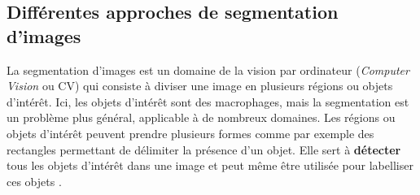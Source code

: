 \documentclass[a4paper,12pt]{report}
\renewcommand{\nameref}[1]{\textbf{\oldnameref{#1}}}
\newcommand{\figref}[1]{Figure~\ref{#1}}
\begin{document}




\subsection{Différentes approches de segmentation d'images}
La segmentation d'images est un domaine de la vision par ordinateur (\textit{Computer Vision} ou CV) qui consiste à diviser une image en plusieurs régions ou objets d'intérêt. Ici, les objets d'intérêt sont des macrophages, mais la segmentation est un problème plus général, applicable à de nombreux domaines. Les régions ou objets d'intérêt peuvent prendre plusieurs formes comme par exemple des rectangles permettant de délimiter la présence d'un objet. Elle sert à \textbf{détecter} tous les objets d'intérêt dans une image et peut même être utilisée pour labelliser ces objets \cite{trex, gsam, gdino,gdino1.5}.
\end{document}
